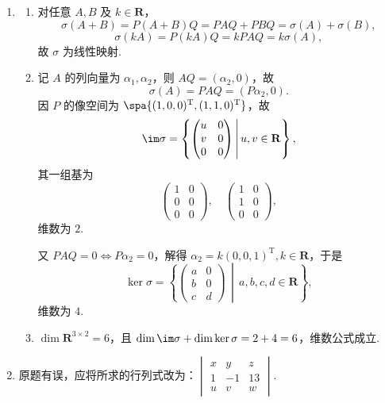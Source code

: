 \begin{enumerate}
    \item
    \begin{enumerate}
        \item 对任意 $A,B$ 及 $k\in\mathbf{R}$，
        \[
            \sigma(A+B)=P(A+B)Q=PAQ+PBQ=\sigma(A)+\sigma(B),
        \]
        \[
            \sigma(kA)=P(kA)Q=kPAQ=k\sigma(A),
        \]
        故 $\sigma$ 为线性映射.

        \item 记 $A$ 的列向量为 $\alpha_1,\alpha_2$，则 $AQ=(\alpha_2,0)$，故
        \[
            \sigma(A)=PAQ=(P\alpha_2,0).
        \]
        因 $P$ 的像空间为 $\spa\{(1,0,0)^\mathrm{T},(1,1,0)^\mathrm{T}\}$，故
        \[
            \im\sigma
            =\left\{\begin{pmatrix}u&0\\v&0\\0&0\end{pmatrix}\,\middle|\,u,v\in\mathbf{R}\right\},
        \]
        其一组基为
        \[
            \begin{pmatrix}1&0\\0&0\\0&0\end{pmatrix},\quad
            \begin{pmatrix}1&0\\1&0\\0&0\end{pmatrix},
        \]
        维数为 $2$.

        又 $PAQ=0\iff P\alpha_2=0$，解得 $\alpha_2 = k(0,0,1)^\mathrm{T}, k \in \mathbf{R}$，于是
        \[
            \ker\sigma
            =\left\{\begin{pmatrix}a&0\\b&0\\c&d\end{pmatrix}\,\middle|\,a,b,c,d\in\mathbf{R}\right\},
        \]
        维数为 $4$.

        \item $\dim\mathbf{R}^{3\times 2}=6$，且 $\dim\im\sigma+\dim\ker\sigma=2+4=6$，维数公式成立.
    \end{enumerate}

    \item 原题有误，应将所求的行列式改为：$\begin{vmatrix}
        x & y & z \\
        1 & -1 & 13 \\
        u & v & w
    \end{vmatrix}$.


\end{enumerate}
